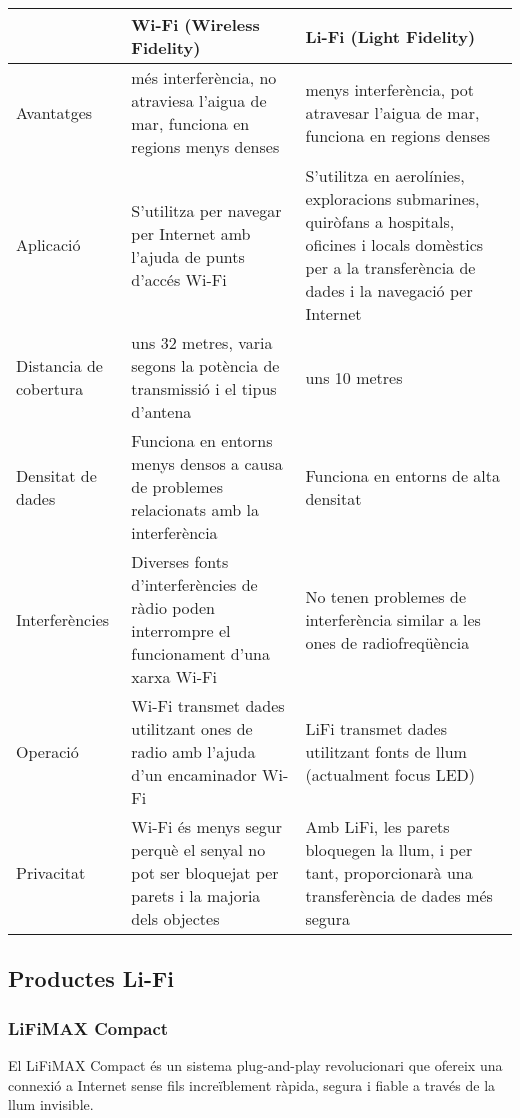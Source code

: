 \begin{table}[h]
\centering
\begin{tabular}{ | p{5.5em} | p{19em} | p{19em} | } 
\hline
 & Wi-Fi  (Wireless Fidelity)& Li-Fi  (Light Fidelity)\\
\hline
Avantatges & més interferència, no atraviesa l'aigua de mar, funciona en regions menys denses 
& menys interferència, pot atravesar l'aigua de mar, funciona en regions denses \\
\hline
Aplicació & S'utilitza per navegar per Internet amb l'ajuda de punts d'accés Wi-Fi 
& S'utilitza en aerolínies, exploracions submarines, quiròfans a hospitals, oficines i locals domèstics per a la transferència de dades i la navegació per Internet \\
\hline
Distancia de cobertura & uns 32 metres, varia segons la potència de transmissió i el tipus d'antena
& uns 10 metres \\
\hline
Densitat de dades & Funciona en entorns menys densos a causa de problemes relacionats amb la interferència 
& Funciona en entorns de alta densitat \\
\hline
Interferències & Diverses fonts d'interferències de ràdio poden interrompre el funcionament d'una xarxa Wi-Fi 
& No tenen problemes de interferència similar a les ones de radiofreqüència\\
\hline
Operació & Wi-Fi transmet dades utilitzant ones de radio amb l'ajuda d'un encaminador Wi-Fi
& LiFi transmet dades utilitzant fonts de llum (actualment focus LED) \\
\hline
Privacitat &  Wi-Fi és menys segur perquè el senyal no pot ser bloquejat per parets i la majoria dels objectes 
& Amb LiFi, les parets bloquegen la llum, i per tant, proporcionarà una transferència de dades més segura \\
\hline
\end{tabular}
\end{table}




\subsection*{Productes Li-Fi}

\subsubsection*{LiFiMAX Compact}

El LiFiMAX Compact és un sistema plug-and-play revolucionari que ofereix una connexió a Internet sense fils increïblement ràpida, segura i fiable a través de la llum invisible.


